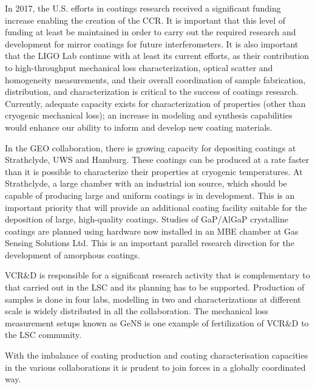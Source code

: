 In 2017, the U.S. efforts in coatings research received a significant funding increase enabling the creation of the CCR.  It is important that this level of funding at least be maintained in order to carry out the required research and development for mirror coatings for future interferometers. It is also important that the LIGO Lab continue with at least its current efforts, as their contribution to high-throughput mechanical loss characterization, optical scatter and homogeneity measurements, and their overall coordination of sample fabrication, distribution, and characterization is critical to the success of coatings research. Currently, adequate capacity exists for characterization of properties (other than cryogenic mechanical loss); an increase in modeling and synthesis capabilities would enhance our ability to inform and develop new coating materials.

In the GEO collaboration, there is growing capacity for depositing coatings at Strathclyde, UWS and Hamburg. These coatings can be produced at a rate faster than it is possible to characterize their properties at cryogenic temperatures. At Strathclyde, a large chamber with an industrial ion source, which should be capable of producing large and uniform coatings is in development. This is an important priority that will provide an additional coating facility suitable for the deposition of large, high-quality coatings. Studies of GaP/AlGaP crystalline coatings are planned using hardware now installed in an MBE chamber at Gas Sensing Solutions Ltd. This is an important parallel research direction for the development of amorphous coatings.

VCR\&D is responsible for a significant research activity that is complementary to that carried out in the LSC and its planning has to be supported. Production of samples is done in four labs, modelling in two and characterizations at different scale is widely distributed in all the collaboration. The mechanical loss measurement setups known as GeNS is one example of fertilization of VCR\&D to the LSC community. 

With the imbalance of coating production and coating characterisation capacities in the various collaborations it is prudent to join forces in a globally coordinated way. 

